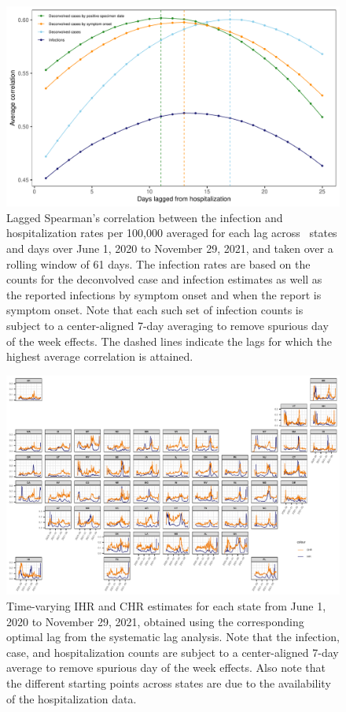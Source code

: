 \documentclass{article}
\begin{document}
\begin{figure}[!tb]
\centering
    \includegraphics[width=.8\textwidth]{adj_unadj_pi_no_inc_hosp_lag_corr_F24.pdf} 
    \caption{Lagged Spearman's correlation between the infection and
    hospitalization rates per 100,000 averaged for each lag across \US\ states
    and days over June 1, 2020 to November 29, 2021, and taken over a rolling
    window of 61 days. The infection rates are based on the counts for the
    deconvolved case and infection estimates as well as the reported infections
    by symptom onset and when the report is symptom onset. Note that each such
    set of infection counts is subject to a center-aligned 7-day averaging to
    remove spurious day of the week effects. The dashed lines indicate the lags
    for which the highest average correlation is attained.}
    \label{fig:adj_unadj_sym_hosp_lag_corr}
\end{figure}

\begin{landscape}
\thispagestyle{empty}
\begin{figure}[!tb]
    \centering
   \includegraphics[width=.99\linewidth]{IHR_7dav_F24.pdf}
    \caption{Time-varying IHR and CHR estimates for each state from June 1, 2020
    to November 29, 2021, obtained using the corresponding optimal lag from the
    systematic lag analysis. Note that the infection, case, and hospitalization
    counts are subject to a center-aligned 7-day average to remove spurious day
    of the week effects. Also note that the different starting points across
    states are due to the availability of the hospitalization data.}
    \label{fig:IHR_7dav}
\fillandplacepagenumber
\end{figure}
\end{landscape}
\end{document}
